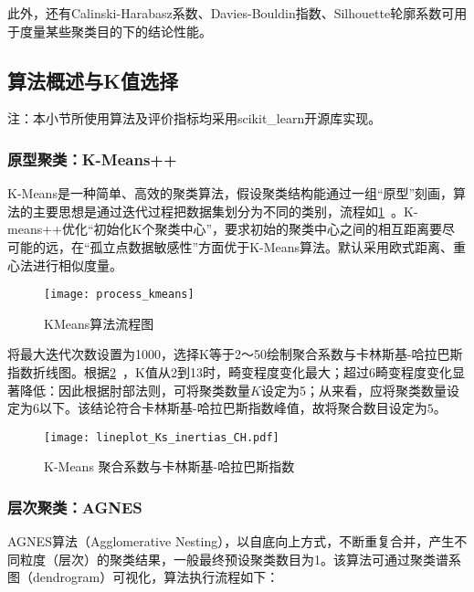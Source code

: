 \documentclass[withoutpreface,bwprint]{cumcmthesis}
\begin{document}
此外，还有Calinski-Harabasz系数\cite{CH}、Davies-Bouldin指数\cite{DB}、Silhouette轮廓系数\cite{SC}可用于度量某些聚类目的下的结论性能。

\subsection{算法概述与K值选择}

注：本小节所使用算法及评价指标均采用scikit\_learn\cite{sklearn}开源库实现。

\subsubsection{原型聚类：K-Means++}

K-Means是一种简单、高效的聚类算法，假设聚类结构能通过一组“原型”刻画，算法的主要思想是通过迭代过程把数据集划分为不同的类别，流程如\cref{fig:008}~。K-means++优化“初始化K个聚类中心”，要求初始的聚类中心之间的相互距离要尽可能的远，在“孤立点数据敏感性”方面优于K-Means算法。默认采用欧式距离、重心法进行相似度量。

\begin{figure}[!htbp]
    \centering
    \texttt{[image: process\_kmeans]}
    \caption{KMeans算法流程图}
    \label{fig:008}
\end{figure}

将最大迭代次数设置为1000，选择K等于2～50绘制聚合系数与卡林斯基-哈拉巴斯指数折线图。根据\cref{fig:009}~，K值从2到13时，畸变程度变化最大；超过6畸变程度变化显著降低：因此根据肘部法则，可将聚类数量$K$设定为5；从来看，应将聚类数量设定为6以下。该结论符合卡林斯基-哈拉巴斯指数峰值，故将聚合数目设定为$5$。

\begin{figure}[!htbp]
    \centering
    \texttt{[image: lineplot\_Ks\_inertias\_CH.pdf]}
    \caption{K-Means 聚合系数与卡林斯基-哈拉巴斯指数}
    \label{fig:009}
\end{figure}

\subsubsection{层次聚类：AGNES}

AGNES算法（Agglomerative
Nesting），以自底向上方式，不断重复合并，产生不同粒度（层次）的聚类结果，一般最终预设聚类数目为1。该算法可通过聚类谱系图（dendrogram）可视化，算法执行流程如下：
\end{document}

